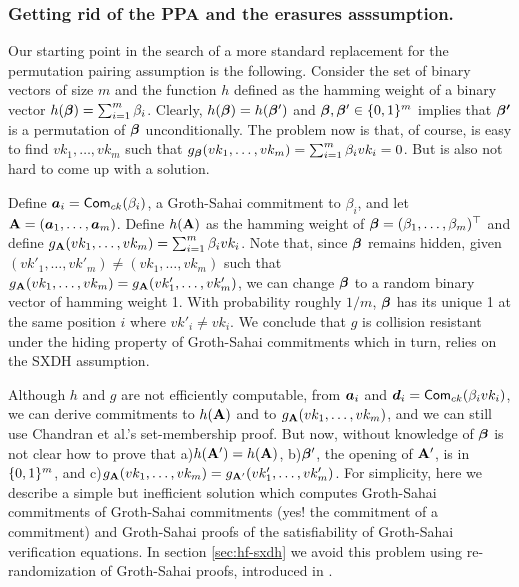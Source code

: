 \subsubsection{Getting rid of the PPA and the erasures asssumption.} Our starting point in the search of a more standard replacement for the permutation pairing assumption is the following. Consider the set of binary vectors of size $m$ and the function $h$ defined as the hamming weight of a binary vector $h({\boldsymbol{\beta}}) = \sum_{i=1}^m \beta_i$. Clearly, $h({\boldsymbol{\beta}})=h({\boldsymbol{\beta}}')$ and ${\boldsymbol{\beta}},{\boldsymbol{\beta}}'\in\{0,1\}^m$ implies that ${\boldsymbol{\beta'}}$ is a permutation of ${\boldsymbol{\beta}}$ unconditionally.
The problem now is that, of course, is easy to find $vk_1,\ldots,{vk}_m$ such that $g_{\boldsymbol{\beta}}(vk_1,\ldots,vk_m) = \sum_{i=1}^m \beta_i vk_i = 0$. But is also not hard to come up with a solution.

Define ${\boldsymbol{a}}_i = \mathsf{Com}_{ck}(\beta_i)$, a Groth-Sahai commitment to $\beta_i$, and let $\mathbf{{A}} = ({\boldsymbol{a}}_1,\ldots, {\boldsymbol{a}}_m)$. Define $h(\mathbf{{A}})$ as the hamming weight of ${\boldsymbol{\beta}} = (\beta_1,\ldots,\beta_m)^\top$ and define $g_{\mathbf{{A}}}(\allowbreak vk_1,\ldots,vk_m) = \sum_{i=1}^m \beta_ivk_i$. Note that, since ${\boldsymbol{\beta}}$ remains hidden, given $(vk'_1,\ldots,vk'_m)\neq (vk_1,\ldots,vk_m)$ such that $g_{\mathbf{{A}}}(vk_1,\ldots,vk_m) =g_{\mathbf{{A}}}(vk'_1,\ldots,vk'_m)$, we can change ${\boldsymbol{\beta}}$ to a random binary vector of hamming weight 1. With probability roughly $1/m$, ${\boldsymbol{\beta}}$ has its unique 1 at the same position $i$ where $vk'_i \neq vk_i$. We conclude that $g$ is collision resistant under the hiding property of Groth-Sahai commitments which in turn, relies on the SXDH assumption.

Although $h$ and $g$ are not efficiently computable, from ${\boldsymbol{a}}_i$ and ${\boldsymbol{d}}_i = \mathsf{Com}_{ck}(\beta_ivk_i)$, we can derive commitments to $h(\mathbf{{A}})$ and to $g_{\mathbf{{A}}}(vk_1,\ldots,vk_m)$, and we can still use Chandran et al.'s set-membership proof. But now, without knowledge of ${\boldsymbol{\beta}}$ is not clear how to prove that a)$h(\mathbf{{A}}')=h(\mathbf{{A}})$, b)${\boldsymbol{\beta}}'$, the opening of $\mathbf{{A}}'$, is in $\{0,1\}^m$,  and c)$g_{\mathbf{{A}}}(vk_1,\ldots,vk_m) =g_{\mathbf{{A}}'}(vk'_1,\ldots,vk'_m)$.
For simplicity, here we describe a simple but inefficient solution which computes Groth-Sahai commitments of Groth-Sahai commitments (yes! the commitment of a commitment) and Groth-Sahai proofs of the satisfiability of Groth-Sahai verification equations. In section \ref{sec:hf-sxdh} we avoid this problem using re-randomization of Groth-Sahai proofs, introduced in \cite{C:BCCKLS09}.
 
